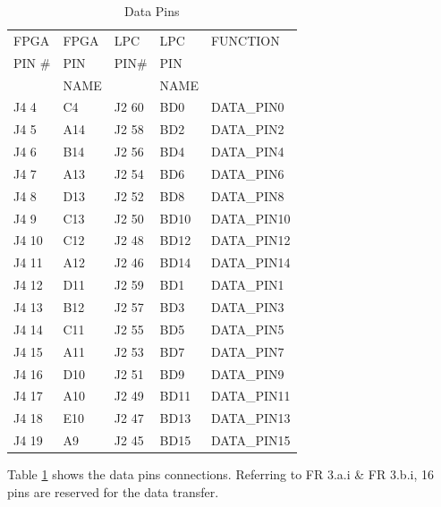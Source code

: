 \begin{table}[H]
\begin{center}
\caption{Data Pins}
\begin{tabular}{|l|l||l|l||l|}
\hline FPGA & FPGA & LPC & LPC & FUNCTION \\ 
PIN \# & PIN & PIN\# & PIN & \\
 & NAME &  & NAME & \\
\hline J4 4 & C4 & J2 60 & BD0 & DATA\_PIN0 \\ 
\hline J4 5 & A14 & J2 58 & BD2 & DATA\_PIN2 \\ 
\hline J4 6 & B14 & J2 56 & BD4 & DATA\_PIN4 \\ 
\hline J4 7 & A13 & J2 54 & BD6 & DATA\_PIN6 \\ 
\hline J4 8 & D13 & J2 52 & BD8 & DATA\_PIN8 \\ 
\hline J4 9 & C13 & J2 50 & BD10 & DATA\_PIN10 \\ 
\hline J4 10 & C12 & J2 48 & BD12 & DATA\_PIN12 \\ 
\hline J4 11 & A12 & J2 46 & BD14 & DATA\_PIN14 \\ 
\hline J4 12 & D11 & J2 59 & BD1 & DATA\_PIN1 \\ 
\hline J4 13 & B12 & J2 57 & BD3 & DATA\_PIN3 \\ 
\hline J4 14 & C11 & J2 55 & BD5 & DATA\_PIN5 \\ 
\hline J4 15 & A11 & J2 53 & BD7 & DATA\_PIN7 \\ 
\hline J4 16 & D10 & J2 51 & BD9 & DATA\_PIN9 \\ 
\hline J4 17 & A10 & J2 49 & BD11 & DATA\_PIN11 \\ 
\hline J4 18 & E10 & J2 47 & BD13 & DATA\_PIN13 \\ 
\hline J4 19 & A9 & J2 45 & BD15 & DATA\_PIN15 \\ 
\hline 
\end{tabular} 
\label{table:datatab} %
\end{center}
\end{table}

Table \ref{table:datatab} shows the data pins connections. Referring to  FR 3.a.i \& FR 3.b.i, 16 pins are reserved for the data transfer. 


